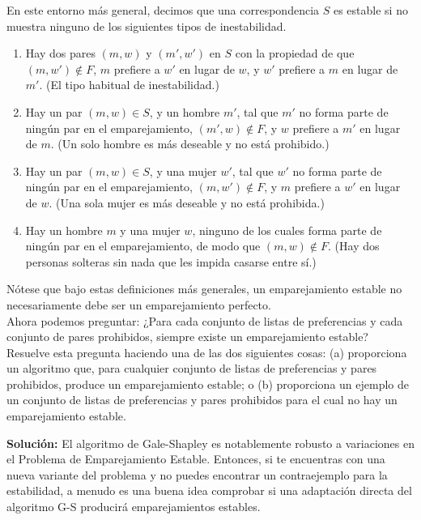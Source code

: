 \documentclass{article}
\begin{document}
En este entorno más general, decimos que una correspondencia $S$ es estable si no muestra ninguno de los siguientes tipos de inestabilidad.

\begin{enumerate}[label=(\roman*)]
\item Hay dos pares $(m, w)$ y $(m', w')$ en $S$ con la propiedad de que $(m, w') \not\in F$, $m$ prefiere a $w'$ en lugar de $w$, y $w'$ prefiere a $m$ en lugar de $m'$. (El tipo habitual de inestabilidad.)
\item Hay un par $(m, w) \in S$, y un hombre $m'$, tal que $m'$ no forma parte de ningún par en el emparejamiento, $(m', w) \not\in F$, y $w$ prefiere a $m'$ en lugar de $m$. (Un solo hombre es más deseable y no está prohibido.)
\item Hay un par $(m, w) \in S$, y una mujer $w'$, tal que $w'$ no forma parte de ningún par en el emparejamiento, $(m, w') \not\in F$, y $m$ prefiere a $w'$ en lugar de $w$. (Una sola mujer es más deseable y no está prohibida.)
\item Hay un hombre $m$ y una mujer $w$, ninguno de los cuales forma parte de ningún par en el emparejamiento, de modo que $(m, w) \not\in F$. (Hay dos personas solteras sin nada que les impida casarse entre sí.)
\end{enumerate}

Nótese que bajo estas definiciones más generales, un emparejamiento estable no necesariamente debe ser un emparejamiento perfecto. \\

Ahora podemos preguntar: ¿Para cada conjunto de listas de preferencias y cada conjunto de pares prohibidos, siempre existe un emparejamiento estable? Resuelve esta pregunta haciendo una de las dos siguientes cosas: (a) proporciona un algoritmo que, para cualquier conjunto de listas de preferencias y pares prohibidos, produce un emparejamiento estable; o (b) proporciona un ejemplo de un conjunto de listas de preferencias y pares prohibidos para el cual no hay un emparejamiento estable.\\

\newpage

\textbf{Solución:} El algoritmo de Gale-Shapley es notablemente robusto a variaciones en el Problema de Emparejamiento Estable. Entonces, si te encuentras con una nueva variante del problema y no puedes encontrar un contraejemplo para la estabilidad, a menudo es una buena idea comprobar si una adaptación directa del algoritmo G-S producirá emparejamientos estables. \\
\end{document}
